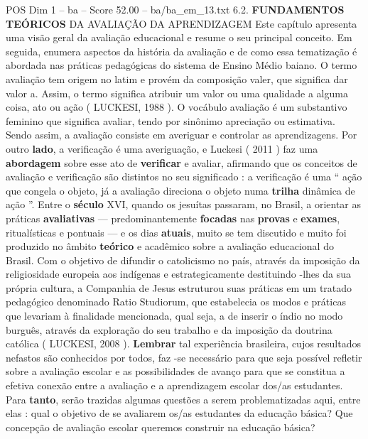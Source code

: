\begin{textsample}{POS Dim 1 – ba – Score 52.00 – ba/ba\_em\_13.txt}  \label{ex:f1_pos_107}
6.2. \textbf{FUNDAMENTOS} \textbf{TEÓRICOS} DA AVALIAÇÃO DA APRENDIZAGEM Este capítulo apresenta uma visão geral da avaliação educacional e resume o seu principal conceito.
Em seguida, enumera aspectos da história da avaliação e de como essa tematização é abordada nas práticas pedagógicas do sistema de Ensino Médio baiano.
O termo avaliação tem origem no latim e provém da composição valer, que significa dar valor a.
Assim, o termo significa atribuir um valor ou uma qualidade a alguma coisa, ato ou ação ( LUCKESI, 1988 ).
O vocábulo avaliação é um substantivo feminino que significa avaliar, tendo por sinônimo apreciação ou estimativa.
Sendo assim, a avaliação consiste em averiguar e controlar as aprendizagens.
Por outro \textbf{lado}, a verificação é uma averiguação, e Luckesi ( 2011 ) faz uma \textbf{abordagem} sobre esse ato de \textbf{verificar} e avaliar, afirmando que os conceitos de avaliação e verificação são distintos no seu significado : a verificação é uma “ ação que congela o objeto, já a avaliação direciona o objeto numa \textbf{trilha} dinâmica de ação ”.
Entre o \textbf{século} XVI, quando os jesuítas passaram, no Brasil, a orientar as práticas \textbf{avaliativas} — predominantemente \textbf{focadas} nas \textbf{provas} e \textbf{exames}, ritualísticas e pontuais — e os dias \textbf{atuais}, muito se tem discutido e muito foi produzido no âmbito \textbf{teórico} e acadêmico sobre a avaliação educacional do Brasil.
Com o objetivo de difundir o catolicismo no país, através da imposição da religiosidade europeia aos indígenas e estrategicamente destituindo -lhes da sua própria cultura, a Companhia de Jesus estruturou suas práticas em um tratado pedagógico denominado Ratio Studiorum, que estabelecia os modos e práticas que levariam à finalidade mencionada, qual seja, a de inserir o índio no modo burguês, através da exploração do seu trabalho e da imposição da doutrina católica ( LUCKESI, 2008 ). \textbf{Lembrar} tal experiência brasileira, cujos resultados nefastos são conhecidos por todos, faz -se necessário para que seja possível refletir sobre a avaliação escolar e as possibilidades de avanço para que se constitua a efetiva conexão entre a avaliação e a aprendizagem escolar dos/as estudantes.
Para \textbf{tanto}, serão trazidas algumas questões a serem problematizadas aqui, entre elas : qual o objetivo de se avaliarem os/as estudantes da educação básica?
Que concepção de avaliação escolar queremos construir na educação básica?

\end{textsample}
